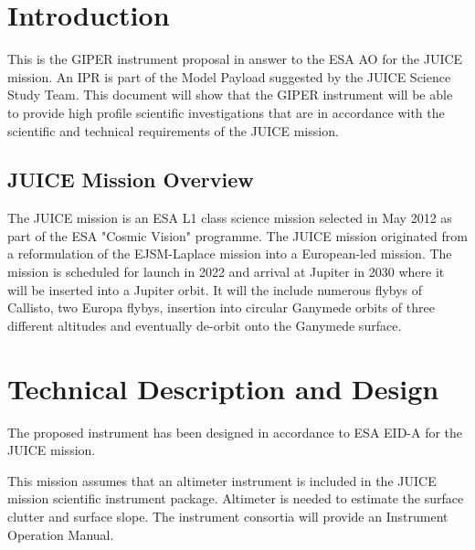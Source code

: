 \section{Introduction}
\label{sec:introduction}
%
This is the \ac{GIPER} instrument proposal in answer to the \ac{ESA} \ac{AO}\cite{JUICE_AO} for the \ac{JUICE} mission. An \ac{IPR} is part of the Model Payload suggested by the  JUICE Science Study Team\cite{yellowbook}. This document will show that the \ac{GIPER} instrument will be able to provide high profile scientific investigations that are in accordance with the scientific and technical requirements of the \ac{JUICE} mission.
%
\subsection{JUICE Mission Overview}
The \ac{JUICE} mission is an \ac{ESA} L1 class science mission selected in May 2012 as part of the \ac{ESA} "Cosmic Vision" programme. The \ac{JUICE} mission originated from a reformulation of the EJSM-Laplace mission into a European-led mission. The mission is scheduled for launch in 2022 and arrival at Jupiter in 2030 where it will be inserted into a Jupiter orbit. It will the include numerous flybys of Callisto, two Europa flybys, insertion into circular Ganymede orbits of three different altitudes and eventually de-orbit onto the Ganymede surface. 
%
%
%

%
\section{Technical Description and Design}
%
The proposed instrument has been designed in accordance to ESA \ac{EID-A} for the \ac{JUICE} mission\cite{EIDA}.
%
%

%
%
This mission assumes that an altimeter instrument is included in the JUICE mission scientific instrument package. Altimeter is needed to estimate the surface clutter and surface slope.
%
The instrument consortia will provide an Instrument Operation Manual.
%
